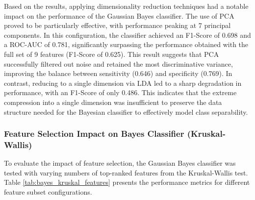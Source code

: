 \documentclass[12pt,a4paper]{article}
\begin{document}
Based on the results, applying dimensionality reduction techniques had a notable impact on the performance of the Gaussian Bayes classifier. The use of PCA proved to be particularly effective, with performance peaking at 7 principal components. In this configuration, the classifier achieved an F1-Score of 0.698 and a ROC-AUC of 0.781, significantly surpassing the performance obtained with the full set of 9 features (F1-Score of 0.625). This result suggests that PCA successfully filtered out noise and retained the most discriminative variance, improving the balance between sensitivity (0.646) and specificity (0.769). In contrast, reducing to a single dimension via LDA led to a sharp degradation in performance, with an F1-Score of only 0.486. This indicates that the extreme compression into a single dimension was insufficient to preserve the data structure needed for the Bayesian classifier to effectively model class separability.

\subsubsection*{Feature Selection Impact on Bayes Classifier (Kruskal-Wallis)}
To evaluate the impact of feature selection, the Gaussian Bayes classifier was tested with varying numbers of top-ranked features from the Kruskal-Wallis test. Table \ref{tab:bayes_kruskal_features} presents the performance metrics for different feature subset configurations.
\end{document}
